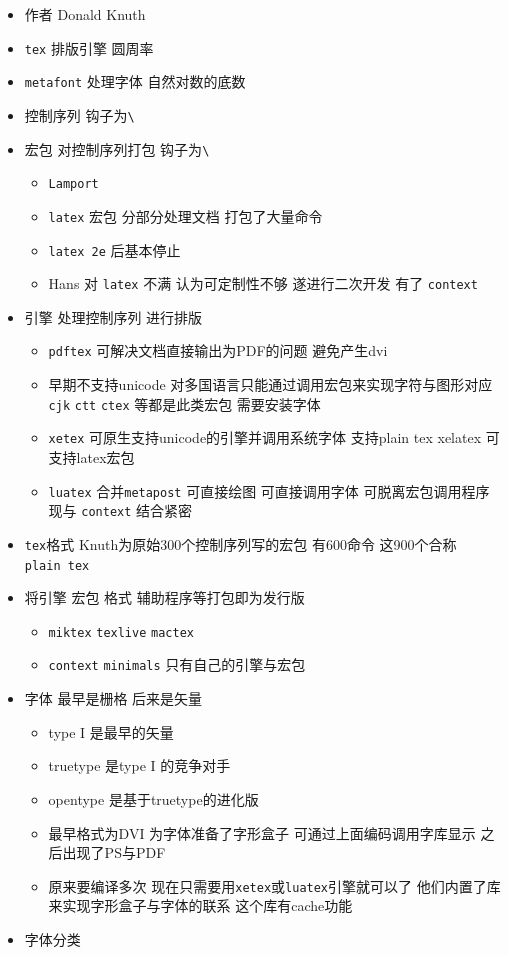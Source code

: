 \documentclass[
]{book}
\begin{document}
\begin{itemize}
\item
  作者 Donald Knuth
\item
  \texttt{tex} 排版引擎 圆周率
\item
  \texttt{metafont} 处理字体 自然对数的底数
\item
  控制序列 钩子为\texttt{\textbackslash{}}
\item
  宏包 对控制序列打包 钩子为\texttt{\textbackslash{}}

  \begin{itemize}
  \item
    \texttt{Lamport}
  \item
    \texttt{latex} 宏包 分部分处理文档 打包了大量命令
  \item
    \texttt{latex\ 2e} 后基本停止
  \item
    Hans 对 \texttt{latex} 不满 认为可定制性不够 遂进行二次开发 有了 \texttt{context}
  \end{itemize}
\item
  引擎 处理控制序列 进行排版

  \begin{itemize}
  \item
    \texttt{pdftex} 可解决文档直接输出为PDF的问题 避免产生dvi
  \item
    早期不支持unicode 对多国语言只能通过调用宏包来实现字符与图形对应 \texttt{cjk} \texttt{ctt} \texttt{ctex} 等都是此类宏包 需要安装字体
  \item
    \texttt{xetex} 可原生支持unicode的引擎并调用系统字体 支持plain tex xelatex 可支持latex宏包
  \item
    \texttt{luatex} 合并\texttt{metapost} 可直接绘图 可直接调用字体 可脱离宏包调用程序 现与 \texttt{context} 结合紧密
  \end{itemize}
\item
  \texttt{tex}格式 Knuth为原始300个控制序列写的宏包 有600命令 这900个合称\texttt{plain\ tex}
\item
  将引擎 宏包 格式 辅助程序等打包即为发行版

  \begin{itemize}
  \item
    \texttt{miktex} \texttt{texlive} \texttt{mactex}
  \item
    \texttt{context} \texttt{minimals} 只有自己的引擎与宏包
  \end{itemize}
\item
  字体 最早是栅格 后来是矢量

  \begin{itemize}
  \item
    type I 是最早的矢量
  \item
    truetype 是type I 的竞争对手
  \item
    opentype 是基于truetype的进化版
  \item
    最早格式为DVI 为字体准备了字形盒子 可通过上面编码调用字库显示 之后出现了PS与PDF
  \item
    原来要编译多次 现在只需要用\texttt{xetex}或\texttt{luatex}引擎就可以了 他们内置了库来实现字形盒子与字体的联系 这个库有cache功能
  \end{itemize}
\item
  字体分类


\end{itemize}
\end{document}

